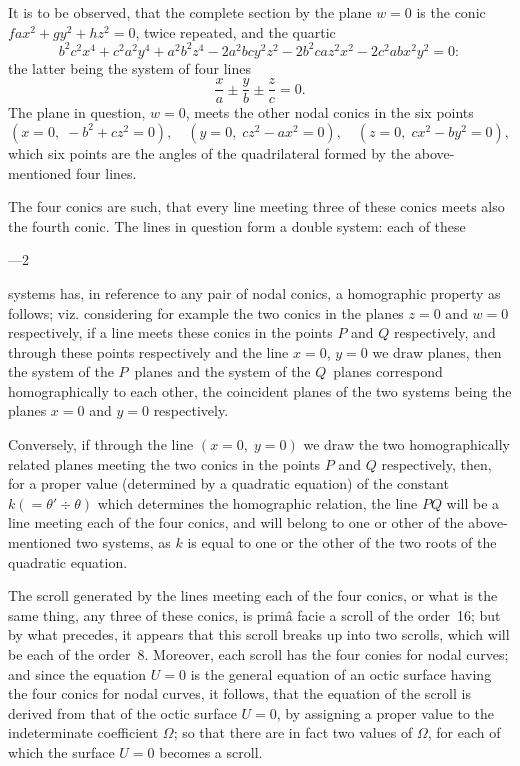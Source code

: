 \documentclass[12pt,a4paper]{article}
\theoremstyle{plain}
\begin{document}
It is to be observed, that the complete section by the plane $w = 0$ is the conic $fax^{2} + gy^{2} + hz^{2} = 0$, twice repeated, and the quartic
\[
b^{2}c^{2}x^{4} + c^{2}a^{2}y^{4} + a^{2}b^{2}z^{4} - 2a^{2}bc y^{2}z^{2} - 2b^{2}ca z^{2}x^{2} - 2c^{2}ab x^{2}y^{2} = 0:
\]
the latter being the system of four lines
\[
\frac{x}{a} \pm \frac{y}{b} \pm \frac{z}{c} = 0.
\]
The plane in question, $w = 0$, meets the other nodal conics in the six points
\[
(x=0,\; -b^{2} + cz^{2}=0), \quad (y=0,\; cz^{2} - ax^{2}=0), \quad (z=0,\; cx^{2} - by^{2}=0),
\]
which six points are the angles of the quadrilateral formed by the above-mentioned four lines.

The four conics are such, that every line meeting three of these conics meets also the fourth conic. The lines in question form a double system: each of these

\medskip{}---2

\newpage
\setcounter{page}{104}

systems has, in reference to any pair of nodal conics, a homographic property as follows; viz. considering for example the two conics in the planes $z = 0$ and $w = 0$ respectively, if a line meets these conics in the points $P$ and $Q$ respectively, and through these points respectively and the line $x=0$, $y=0$ we draw planes, then the system of the $P$~planes and the system of the $Q$~planes correspond homographically to each other, the coincident planes of the two systems being the planes $x=0$ and $y=0$ respectively.

Conversely, if through the line $(x=0,\; y=0)$ we draw the two homographically related planes meeting the two conics in the points $P$ and $Q$ respectively, then, for a proper value (determined by a quadratic equation) of the constant $k(=\theta' \div \theta)$ which determines the homographic relation, the line $PQ$ will be a line meeting each of the four conics, and will belong to one or other of the above-mentioned two systems, as $k$ is equal to one or the other of the two roots of the quadratic equation.

The scroll generated by the lines meeting each of the four conics, or what is the same thing, any three of these conics, is prim\^{a} facie a scroll of the order~16; but by what precedes, it appears that this scroll breaks up into two scrolls, which will be each of the order~8. Moreover, each scroll has the four conies for nodal curves; and since the equation $U=0$ is the general equation of an octic surface having the four conics for nodal curves, it follows, that the equation of the scroll is derived from that of the octic surface $U=0$, by assigning a proper value to the indeterminate coefficient $\Omega$; so that there are in fact two values of $\Omega$, for each of which the surface $U=0$ becomes a scroll.
\end{document}
